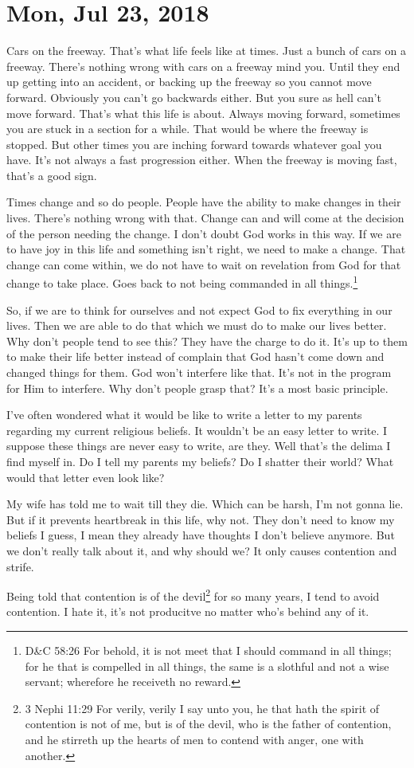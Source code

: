 \section{Mon, Jul 23, 2018}

Cars on the freeway. That's what life feels like at times. Just a bunch of cars on a
freeway. There's nothing wrong with cars on a freeway mind you. Until they end up
getting into an accident, or backing up the freeway so you cannot move forward.
Obviously you can't go backwards either. But you sure as hell can't move forward.
That's what this life is about. Always  moving forward, sometimes you are stuck in a
section for a while. That would be where the freeway is stopped. But other times you
are inching forward towards whatever goal you have. It's not always a fast
progression either. When the freeway is moving fast, that's a good sign.

Times change and so do people. People have the ability to make changes in their
lives. There's nothing wrong with that. Change can and will come at the decision of
the person needing the change. I don't doubt God works in this way. If we are to have
joy in this life and something isn't right, we need to make a change. That change can
come within, we do not have to wait on revelation from God for that change to take
place. Goes back to not being commanded in all things.\footnote{D\&C 58:26 For behold, 
it is not meet that I should command in all things; for he that is compelled in all 
things, the same is a slothful and not a wise servant; wherefore he receiveth no 
reward.}

So, if we are to think for ourselves and not expect God to fix everything in our
lives. Then we are able to do that which we must do to make our lives better. Why
don't people tend to see this? They have the charge to do it. It's up to them to make
their life better instead of complain that God hasn't come down and changed things
for them. God won't interfere like that. It's not in the program for Him to
interfere. Why don't people grasp that? It's a most basic principle.

I've often wondered what it would be like to write a letter to my parents regarding
my current religious beliefs. It wouldn't be an easy letter to write. I suppose these
things are never easy to write, are they. Well that's the delima I find myself in. Do
I tell my parents my beliefs? Do I shatter their world? What would that letter even
look like?

My wife has told me to wait till they die. Which can be harsh, I'm not gonna lie. But
if it prevents heartbreak in this life, why not. They don't need to know my beliefs I
guess, I mean they already have thoughts I don't believe anymore. But we don't really
talk about it, and why should we? It only causes contention and strife.

Being told that contention is of the devil\footnote{
3 Nephi 11:29 For verily, verily I say unto you, he that hath the spirit of 
contention is not of me, but is of the devil, who is the father of contention, 
and he stirreth up the hearts of men to contend with anger, one with another.
} for so many years, I tend to avoid contention. I hate it, it's not producitve no 
matter who's behind any of it.